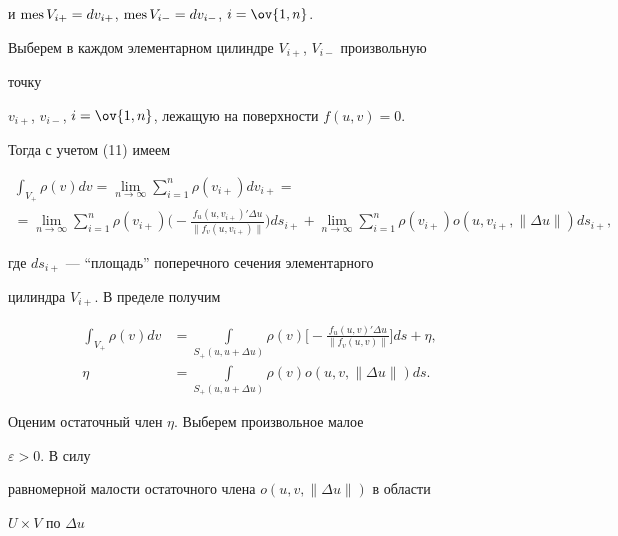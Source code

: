 и $\operatorname{mes} V_{i+}=dv_{i+}$, $\operatorname{mes} V_{i-}=dv_{i-}$, $i=\ov{1,n}$.


Выберем в каждом элементарном цилиндре $V_{i+}$, $V_{i-}$ произвольную 


точку 


$v_{i+}$, $v_{i-}$, $i=\ov{1,n}$, лежащую на поверхности $f(u,v)=0$. 


Тогда с учетом (11) имеем


\begin{multline*}


\int_{V_+}\rho(v)dv=\lim_{n\to\infty}\sum^n_{i=1}


\rho(v_{i+})dv_{i+}= \\ =\lim_{n\to\infty}\sum^n_{i=1}


\rho(v_{i+})\bigg(-\frac{f_u(u,v_{i+})'\Delta u}


{\|f_v(u,v_{i+})\|}


\bigg)ds_{i+}+\lim_{n\to\infty}\sum^n_{i=1}


\rho(v_{i+})o(u,v_{i+},\|\Delta u\|)ds_{i+},


\end{multline*}


где $ds_{i+}$ --- ``площадь'' поперечного сечения элементарного


цилиндра $V_{i+}$. В пределе получим


\begin{equation}


\begin{split}


\int_{V_+}\rho(v)dv&=\int\limits_{S_+(u,u+\Delta u)}\rho(v)


\bigg[-\frac{f_u(u,v)'\Delta u}{\|f_v(u,v)\|}\bigg]ds+\eta, \\


\eta&=\int\limits_{S_+(u,u+\Delta u)}\rho(v)


o(u,v,\|\Delta u\|)ds.


\end{split}


\end{equation}





Оценим остаточный член $\eta$. Выберем произвольное малое 


$\varepsilon>0$. В силу


равномерной малости остаточного члена $o(u,v,\|\Delta u\|)$ в области 


$U\times V$ по $\Delta u$


